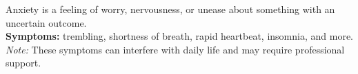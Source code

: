 Anxiety is a feeling of worry, nervousness, or unease about something with an uncertain outcome.\\
\textbf{Symptoms:} trembling, shortness of breath, rapid heartbeat, insomnia, and more.\\
\textit{Note:} These symptoms can interfere with daily life and may require professional support.\\ 